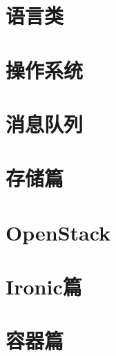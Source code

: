 \documentclass[newfloat,tikz,usenames,dvipsnames,svgnames,table,b5paper]{book}
\begin{document}
\part{语言类}


%

\part{操作系统}




\part{消息队列}

\part{存储篇}


\part{OpenStack}

\part{Ironic篇}





\part{容器篇}




\end{document}

